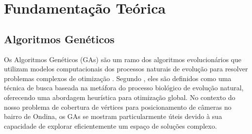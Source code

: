 \documentclass[12pt, a4paper]{report}
\begin{document}
\chapter{Fundamentação Teórica}

\section{Algoritmos Genéticos}
Os Algoritmos Genéticos (GAs) são um ramo dos algoritmos evolucionários que utilizam modelos computacionais dos processos naturais de evolução para resolver problemas complexos de otimização \cite{Holland1975}. Segundo \cite{Linden2006}, eles são definidos como uma técnica de busca baseada na metáfora do processo biológico de evolução natural, oferecendo uma abordagem heurística para otimização global. No contexto do nosso problema de cobertura de vértices para posicionamento de câmeras no bairro de Ondina, os GAs se mostram particularmente úteis devido à sua capacidade de explorar eficientemente um espaço de soluções complexo.
\end{document}
